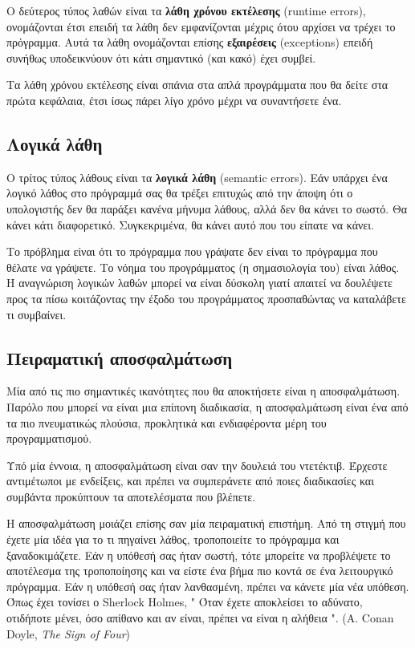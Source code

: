 \documentclass[10pt]{book}
\begin{document}
Ο δεύτερος τύπος λαθών είναι τα {\bf λάθη χρόνου εκτέλεσης} (runtime errors), ονομάζονται
έτσι επειδή τα λάθη δεν εμφανίζονται μέχρις ότου αρχίσει να τρέχει το πρόγραμμα. 
Αυτά τα λάθη ονομάζονται επίσης {\bf εξαιρέσεις} (exceptions) επειδή συνήθως
υποδεικνύουν ότι κάτι σημαντικό (και κακό) έχει συμβεί.

Τα λάθη χρόνου εκτέλεσης είναι σπάνια στα απλά προγράμματα που θα δείτε
στα πρώτα κεφάλαια, έτσι ίσως πάρει λίγο χρόνο μέχρι να συναντήσετε ένα.

\subsection{Λογικά λάθη}

Ο τρίτος τύπος λάθους είναι τα {\bf λογικά λάθη} (semantic errors).  Εάν υπάρχει ένα λογικό
λάθος στο πρόγραμμά σας θα τρέξει επιτυχώς από την άποψη ότι ο υπολογιστής
δεν θα παράξει κανένα μήνυμα λάθους, αλλά δεν θα κάνει το σωστό. Θα
κάνει κάτι διαφορετικό.  Συγκεκριμένα, θα κάνει αυτό που του είπατε να
κάνει.

Το πρόβλημα είναι ότι το πρόγραμμα που γράψατε δεν είναι το πρόγραμμα
που θέλατε να γράψετε.  Το νόημα του προγράμματος (η σημασιολογία του)
είναι λάθος.  Η αναγνώριση λογικών λαθών μπορεί να είναι δύσκολη γιατί
απαιτεί να δουλέψετε προς τα πίσω κοιτάζοντας την έξοδο του προγράμματος
προσπαθώντας να καταλάβετε τι συμβαίνει.

\subsection{Πειραματική αποσφαλμάτωση}

Μία από τις πιο σημαντικές ικανότητες που θα αποκτήσετε είναι
η αποσφαλμάτωση.  Παρόλο που μπορεί να είναι μια επίπονη διαδικασία,
η αποσφαλμάτωση είναι ένα από τα πιο πνευματικώς πλούσια, προκλητικά
και ενδιαφέροντα μέρη του προγραμματισμού.


Υπό μία έννοια, η αποσφαλμάτωση είναι σαν την δουλειά του ντετέκτιβ.  
Έρχεστε αντιμέτωποι με ενδείξεις, και πρέπει να συμπεράνετε από ποιες
διαδικασίες και συμβάντα προκύπτουν τα αποτελέσματα που βλέπετε.

Η αποσφαλμάτωση μοιάζει επίσης σαν μία πειραματική επιστήμη.  Από τη στιγμή
που έχετε μία ιδέα για το τι πηγαίνει λάθος, τροποποιείτε το πρόγραμμα και
ξαναδοκιμάζετε.  Εάν η υπόθεσή σας ήταν σωστή, τότε μπορείτε να προβλέψετε
το αποτέλεσμα της τροποποίησης και να είστε ένα βήμα πιο κοντά σε ένα
λειτουργικό πρόγραμμα.  Εάν η υπόθεσή σας ήταν λανθασμένη, πρέπει να κάνετε
μία νέα υπόθεση.  Όπως έχει τονίσει ο  Sherlock Holmes, "   Όταν έχετε
αποκλείσει το αδύνατο, οτιδήποτε μένει, όσο απίθανο και αν είναι, πρέπει να
είναι η αλήθεια ". (A. Conan Doyle, {\em The Sign of Four})
\end{document}
